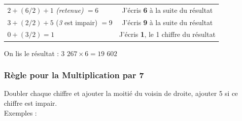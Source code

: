 \documentclass[a4paper, twoside]{article}
\begin{document}
\begin{small}
\begin{enumerate}
\begin{tabular}{l|c}
				\tabularnewline
				
				$2 + (6/2) + 1$ \textit{(retenue)} $= 6$ & J'écris \textbf{6} à la suite du résultat
				
				\tabularnewline
				
				$3 + (2/2) + 5$ (\textit{3} est impair) $= 9$  & J'écris \textbf{9} à la suite du résultat
				
				\tabularnewline
				
				$0 + (3/2) = 1$ & J'écris \textbf{1}, le 1\up{er} chiffre du résultat
						
			\end{tabular}
			
			On lis le résultat : {\boldmath $3$ $267 \times 6 = 19$ $602$}\\	
			
		\end{enumerate}
		\end{small}

		\vfill

		\newpage





		\subsubsection*{Règle pour la Multiplication par 7}

		Doubler chaque chiffre et ajouter la moitié du voisin de droite, ajouter 5 si ce chiffre est impair.\\

		{ \parindent=0.5cm Exemples : }
\end{document}
